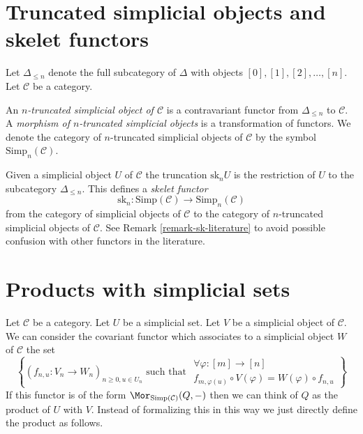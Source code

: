 \section{Truncated simplicial objects and skelet functors}
\label{section-skelet}

\noindent
Let $\Delta_{\leq n}$ denote the full subcategory of
$\Delta$ with objects $[0], [1], [2], \ldots, [n]$.
Let $\mathcal{C}$ be a category.

\begin{definition}
\label{definition-truncated-simplicial-object}
An {\it $n$-truncated simplicial object of $\mathcal{C}$}
is a contravariant functor from $\Delta_{\leq n}$ to
$\mathcal{C}$. A {\it morphism of $n$-truncated
simplicial objects} is a transformation of functors.
We denote the category of $n$-truncated
simplicial objects of $\mathcal{C}$ by
the symbol $\text{Simp}_n(\mathcal{C})$.
\end{definition}

\noindent
Given a simplicial object $U$ of $\mathcal{C}$
the truncation $\text{sk}_n U$ is the restriction
of $U$ to the subcategory $\Delta_{\leq n}$.
This defines a {\it skelet functor}
$$
\text{sk}_n :
\text{Simp}(\mathcal{C}) \longrightarrow \text{Simp}_n(\mathcal{C})
$$
from the category of simplicial objects of $\mathcal{C}$
to the category of $n$-truncated simplicial objects of $\mathcal{C}$.
See Remark \ref{remark-sk-literature} to avoid possible confusion
with other functors in the literature.




\section{Products with simplicial sets}
\label{section-product-with-simplicial-sets}

\noindent
Let $\mathcal{C}$ be a category.
Let $U$ be a simplicial set.
Let $V$ be a simplicial object of $\mathcal{C}$.
We can consider the covariant functor which associates
to a simplicial object $W$ of $\mathcal{C}$
the set
\begin{equation}
\label{equation-functor-product-with-simplicial-set}
\left\{
(f_{n, u} : V_n \to W_n)_{n \geq 0, u \in U_n}
\text{ such that }
\begin{matrix}
\forall \varphi : [m] \to [n] \\
f_{m, \varphi(u)} \circ V(\varphi) = W(\varphi) \circ f_{n, u}
\end{matrix}
\right\}
\end{equation}
If this functor is of the form
$\Mor_{\text{Simp}(\mathcal{C})}(Q, -)$
then we can think of $Q$ as the product of $U$ with $V$.
Instead of formalizing this in this way we just directly
define the product as follows.

